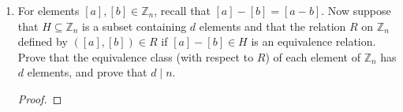 \documentclass[12pt,a4paper,reqno,parskip=full]{amsart}
\numberwithin{equation}{section}
\theoremstyle{plain}
\theoremstyle{definition}
\begin{document}
\begin{enumerate}
\begin{itemize}
\begin{proof}
\begin{enumerate}[i]
                          $(a,c)$, so $(a,c)\in R\cap S$.
                  \end{enumerate}
                \end{proof}
        \end{itemize}
  \item For elements $[a],[b]\in\mathbb{Z}_n$, recall that  $[a]-[b]=[a-b]$. Now suppose that
        $H\subseteq\mathbb{Z}_n$ is a subset containing $d$ elements and that the relation $R$ on
        $\mathbb{Z}_n$ defined by $([a],[b])\in R$ if $[a]-[b]\in H$ is an equivalence relation.
Prove that the equivalence class (with respect to $R$) of each element of $\mathbb{Z}_n$ has
        $d$ elements, and prove that $d\mid n$.
        \begin{proof}
          
        \end{proof}
\end{enumerate}
\end{document}
